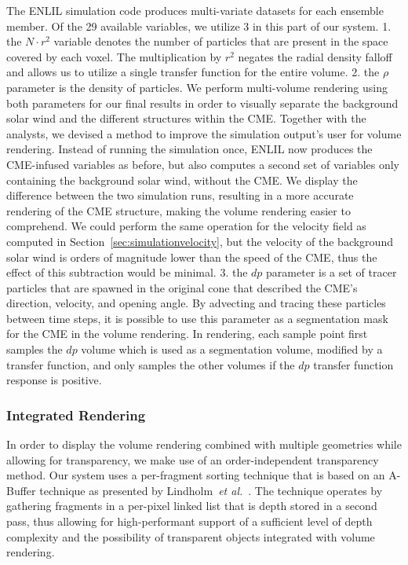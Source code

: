\documentclass[journal]{vgtc}                %
\def\etal{\textit{et al.}}
\def\etal{\textit{et al.}}
\begin{document}
 The ENLIL simulation code produces multi-variate datasets for each ensemble member. Of the 29 available variables, we utilize 3 in this part of our system. 1. the $N \cdot r^2$ variable denotes the number of particles that are present in the space covered by each voxel. The multiplication by $r^2$ negates the radial density falloff and allows us to utilize a single transfer function for the entire volume. 2. the $\rho$ parameter is the density of particles. We perform multi-volume rendering using both parameters for our final results in order to visually separate the background solar wind and the different structures within the CME. Together with the analysts, we devised a method to improve the simulation output's user for volume rendering. Instead of running the simulation once, ENLIL now produces the CME-infused variables as before, but also computes a second set of variables only containing the background solar wind, without the CME. We display the difference between the two simulation runs, resulting in a more accurate rendering of the CME structure, making the volume rendering easier to comprehend. We could perform the same operation for the velocity field as computed in Section~\ref{sec:simulationvelocity}, but the velocity of the background solar wind is orders of magnitude lower than the speed of the CME, thus the effect of this subtraction would be minimal. 3. the $dp$ parameter is a set of tracer particles that are spawned in the original cone that described the CME's direction, velocity, and opening angle. By advecting and tracing these particles between time steps, it is possible to use this parameter as a segmentation mask for the CME in the volume rendering. In rendering, each sample point first samples the $dp$ volume which is used as a segmentation volume, modified by a transfer function, and only samples the other volumes if the $dp$ transfer function response is positive.

\subsubsection{Integrated Rendering} \label{sec:integration}
In order to display the volume rendering combined with multiple geometries while allowing for transparency, we make use of an order-independent transparency method. Our system uses a per-fragment sorting technique that is based on an A-Buffer technique as presented by Lindholm~\etal~\cite{Lindholm:2014fm}. The technique operates by gathering fragments in a per-pixel linked list that is depth stored in a second pass, thus allowing for high-performant support of a sufficient level of depth complexity and the possibility of transparent objects integrated with volume rendering. 
\end{document}
